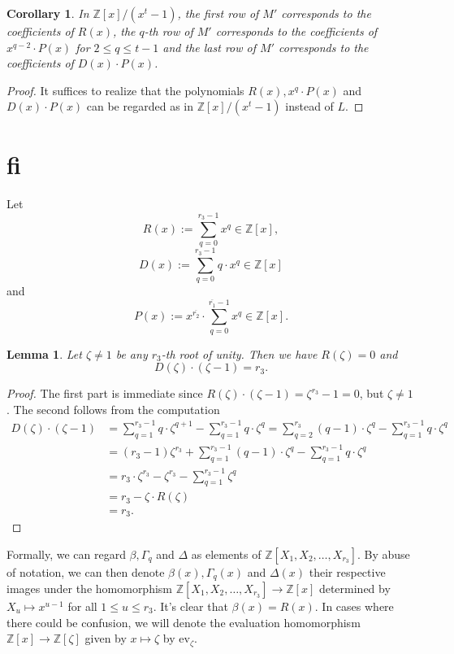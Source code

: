 \documentclass[12pt,a4paper]{article}
\newtheorem{lemma}[theorem]{Lemma}
\newtheorem{cor}[theorem]{Corollary}
\theoremstyle{definition}
\newcommand{\Z}{\mathbb{Z}}
\newcommand{\z}{\zeta}
\newcommand{\ev}{\mathrm{ev}}
\newcommand{\uo}{\overline{r_2}}
\newcommand{\vo}{\overline{r_1}}
\begin{document}
\begin{cor}
In $\Z[x]/(x^t-1)$, the first row of $M'$ corresponds to the coefficients of $R(x)$, the $q$-th row of $M'$ corresponds to the coefficients of $x^{q-2}\cdot P(x)$ for $2\leq q\leq t-1$ and the last row of $M'$ corresponds to the coefficients of $D(x)\cdot P(x)$.
\end{cor}
\begin{proof}
It suffices to realize that the polynomials $R(x), x^q\cdot P(x)$ and $D(x)\cdot P(x)$ can be regarded as in $\Z[x]/(x^t-1)$ instead of $L$.
\end{proof}
\section{fi}
\fi

\paragraph*{}
Let $$R(x):=\sum_{q=0}^{r_3-1} x^q\in\Z[x],$$
$$D(x):=\sum_{q=0}^{r_3-1}q\cdot x^q\in \Z[x]$$
and 
$$P(x):=x^{\uo}\cdot \sum_{q=0}^{\vo-1} x^q\in \Z[x].$$

\begin{lemma}
Let $\zeta\neq 1$ be any $r_3$-th root of unity. Then we have $R(\zeta)=0$ and $$D(\zeta)\cdot(\zeta-1)=r_3.$$
\end{lemma}
\begin{proof}
The first part is immediate since $R(\zeta)\cdot(\zeta-1)=\zeta^{r_3}-1=0$, but $\zeta\neq 1$. The second follows from the computation
\begin{equation*}
\begin{split}
D(\zeta)\cdot(\zeta-1)&=\sum_{q=1}^{r_3-1} q\cdot \zeta^{q+1}-\sum_{q=1}^{r_3-1} q\cdot \zeta^q=\sum_{q=2}^{r_3} (q-1)\cdot \zeta^{q}-\sum_{q=1}^{r_3-1} q\cdot \zeta^q\\
&=(r_3-1)\zeta^{r_3}+\sum_{q=1}^{r_3-1} (q-1)\cdot \zeta^{q}-\sum_{q=1}^{r_3-1} q\cdot \zeta^q\\
&=r_3\cdot \zeta^{r_3}-\zeta^{r_3}-\sum_{q=1}^{r_3-1} \zeta^{q}\\
&=r_3-\zeta\cdot R(\zeta)\\
&=r_3.
\end{split}
\end{equation*}
\end{proof}

Formally, we can regard $\beta,\Gamma_q$ and $\Delta$ as elements of $\Z[X_1,X_2,\dots,X_{r_3}]$. By abuse of notation, we can then denote $\beta(x),\Gamma_q(x)$ and $\Delta(x)$ their respective images under the homomorphism $\Z[X_1,X_2,\dots,X_{r_3}]\to \Z[x]$ determined by $X_u\mapsto x^{u-1}$ for all $1\leq u\leq r_3$. It's clear that $\beta(x)=R(x)$. In cases where there could be confusion, we will denote the evaluation homomorphism $\Z[x]\to \Z[\zeta]$ given by $x\mapsto\zeta$ by $\ev_{\z}$.
\end{document}
